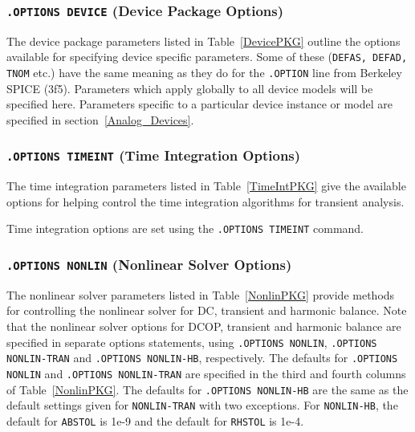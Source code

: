 \subsubsection{\texttt{.OPTIONS DEVICE} (Device Package Options)}

The device package parameters listed in Table~\ref{DevicePKG} outline the options
available for specifying device specific parameters.  Some of these (\texttt{DEFAS,
DEFAD, TNOM} etc.) have the same meaning as they do for
the \texttt{.OPTION} line from Berkeley SPICE (3f5).  Parameters which
apply globally to all device models will be specified here.
Parameters specific to a particular device instance or model are
specified in section~\ref{Analog_Devices}.



\subsubsection{\texttt{.OPTIONS TIMEINT} (Time Integration Options)}

The time integration parameters listed in Table~\ref{TimeIntPKG} give the
available options for helping control the time integration algorithms for
transient analysis.

Time integration options are set using the \texttt{.OPTIONS TIMEINT} command.




\subsubsection{\texttt{.OPTIONS NONLIN} (Nonlinear Solver Options)}

The nonlinear solver parameters listed in Table~\ref{NonlinPKG} provide
methods for controlling the nonlinear solver for 
 DC, 
 transient and harmonic balance. Note that the
nonlinear solver options for DCOP, transient and harmonic balance are
specified in separate options statements, using \texttt{.OPTIONS
 NONLIN}, \texttt{.OPTIONS NONLIN-TRAN} and \texttt{.OPTIONS
 NONLIN-HB}, respectively. The defaults for  \texttt{.OPTIONS
 NONLIN} and \texttt{.OPTIONS NONLIN-TRAN} are specified in the
third and fourth columns of Table~\ref{NonlinPKG}.  The defaults for 
\texttt{.OPTIONS NONLIN-HB} are the same as the default settings given for
\texttt{NONLIN-TRAN} with two exceptions. For \texttt{NONLIN-HB}, the default
for \texttt{ABSTOL} is 1e-9 and the default for \texttt{RHSTOL} is 1e-4.

